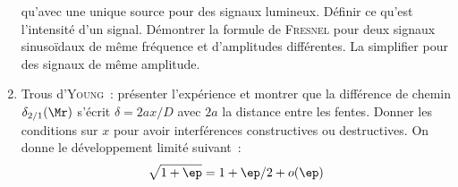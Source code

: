 \documentclass[a4paper, 12pt, final, garamond]{book}
\begin{document}
\begin{enumerate}[resume]
	      qu'avec une unique source pour des signaux lumineux. Définir ce qu'est
	      l'intensité d'un signal. Démontrer la formule de
	      \textsc{Fresnel} pour deux signaux sinusoïdaux de même fréquence et
	      d'amplitudes différentes. La simplifier pour des signaux de même amplitude.
	\item Trous d'\textsc{Young}~: présenter l'expérience et montrer que la
	      différence de chemin $\delta_{2/1}(\Mr)$ s'écrit \hfill $\delta =
		      2ax/D$ avec $2a$ la distance entre les fentes. Donner les conditions sur
	      $x$ pour avoir interférences constructives ou destructives.
	      \smallbreak
	      On donne le développement limité suivant~:
	      \[\sqrt{1+\ep} = 1 + \ep/2 + o(\ep)\]
\end{enumerate}
\end{document}
